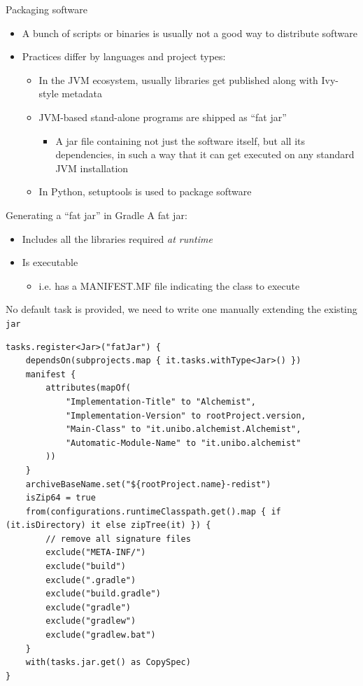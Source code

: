 \documentclass[presentation]{beamer}
\begin{document}
\begin{frame}[fragile]{Packaging software}
    \begin{itemize}
        \item A bunch of scripts or binaries is usually not a good way to distribute software
        \item Practices differ by languages and project types:
        \begin{itemize}
            \item In the JVM ecosystem, usually libraries get published along with Ivy-style metadata
            \item JVM-based stand-alone programs are shipped as ``fat jar''
            \begin{itemize}
                \item A jar file containing not just the software itself, but all its dependencies, in such a way that it can get executed on any standard JVM installation
            \end{itemize}
            \item In Python, setuptools is used to package software
        \end{itemize}
    \end{itemize}
\end{frame}

\begin{frame}{Generating a ``fat jar'' in Gradle}
    A fat jar:
    \begin{itemize}
        \item Includes all the libraries required \textit{at runtime}
        \item Is executable
        \begin{itemize}
            \item i.e. has a MANIFEST.MF file indicating the class to execute
        \end{itemize}
    \end{itemize}
    No default task is provided, we need to write one manually extending the existing \texttt{jar}
    \begin{block}{}
    \begin{verbatim}
tasks.register<Jar>("fatJar") {
    dependsOn(subprojects.map { it.tasks.withType<Jar>() })
    manifest {
        attributes(mapOf(
            "Implementation-Title" to "Alchemist",
            "Implementation-Version" to rootProject.version,
            "Main-Class" to "it.unibo.alchemist.Alchemist",
            "Automatic-Module-Name" to "it.unibo.alchemist"
        ))
    }
    archiveBaseName.set("${rootProject.name}-redist")
    isZip64 = true
    from(configurations.runtimeClasspath.get().map { if (it.isDirectory) it else zipTree(it) }) {
        // remove all signature files
        exclude("META-INF/")
        exclude("build")
        exclude(".gradle")
        exclude("build.gradle")
        exclude("gradle")
        exclude("gradlew")
        exclude("gradlew.bat")
    }
    with(tasks.jar.get() as CopySpec)
}
    \end{verbatim}
    \end{block}
\end{frame}
\end{document}
